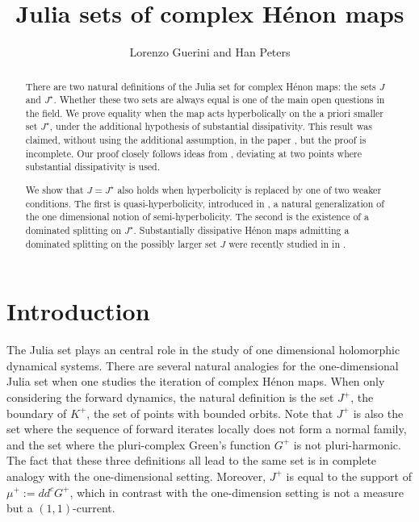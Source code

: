 \documentclass[10pt,a4paper]{article}
\begin{document}
\title{Julia sets of complex H\'enon maps}
\author{Lorenzo Guerini and Han Peters}
\maketitle

\begin{abstract}
There are two natural definitions of the Julia set for complex H\'enon maps: the sets $J$ and $J^\star$. Whether these two sets are always equal is one of the main open questions in the field. We prove equality when the map acts hyperbolically on the a priori smaller set $J^\star$, under the additional hypothesis of substantial dissipativity. This result was claimed, without using the additional assumption, in the paper \cite{F}, but the proof is incomplete. Our proof closely follows ideas from \cite{F}, deviating at two points where substantial dissipativity is used.

We show that $J = J^\star$ also holds when hyperbolicity is replaced by one of two weaker conditions. The first is quasi-hyperbolicity, introduced in \cite{BS8}, a natural generalization of the one dimensional notion of semi-hyperbolicity. The second is the existence of a dominated splitting on $J^\star$. Substantially dissipative H\'enon maps admitting a dominated splitting on the possibly larger set $J$ were recently studied in in \cite{LP}.
\end{abstract}


\section{Introduction}

The Julia set plays an central role in the study of one dimensional holomorphic dynamical systems. There are several natural analogies for the one-dimensional Julia set when one studies the iteration of complex H\'enon maps. When only considering the forward dynamics, the natural definition is the set $J^+$, the boundary of $K^+$, the set of points with bounded orbits. Note that $J^+$ is also the set where the sequence of forward iterates locally does not form a normal family, and the set where the pluri-complex Green's function $G^+$ is not pluri-harmonic. The fact that these three definitions all lead to the same set is in complete analogy with the one-dimensional setting. Moreover, $J^+$ is equal to the support of $\mu^+ := dd^c G^+$, which in contrast with the one-dimension setting is not a measure but a $(1,1)$-current.
\end{document}
